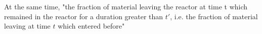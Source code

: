 At the same time, "the fraction of material leaving the reactor at time t which remained in the reactor for a duration greater than $t'$, i.e. the fraction of material leaving at time $t$ which entered before"  